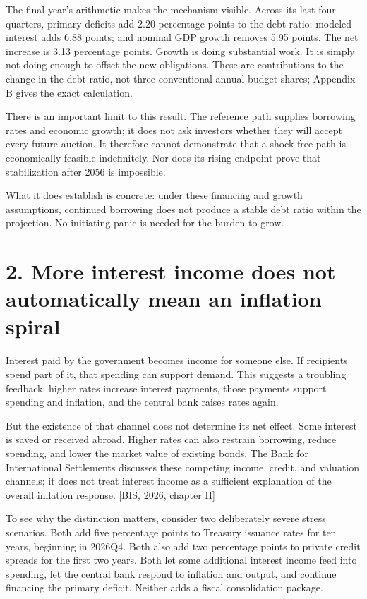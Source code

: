 \documentclass[11pt,letterpaper]{article}
\newcommand{\src}[2]{\href{#1}{#2}}
\begin{document}
The final year's arithmetic makes the mechanism visible. Across its last four
quarters, primary deficits add 2.20 percentage points to the debt ratio;
modeled interest adds 6.88 points; and nominal GDP growth removes 5.95 points.
The net increase is 3.13 percentage points. Growth is doing substantial work.
It is simply not doing enough to offset the new obligations.
These are contributions to the change in the debt ratio, not three conventional
annual budget shares; Appendix B gives the exact calculation.

There is an important limit to this result. The reference path supplies
borrowing rates and economic growth; it does not ask investors whether they
will accept every future auction. It therefore cannot demonstrate that a
shock-free path is economically feasible indefinitely. Nor does its rising
endpoint prove that stabilization after 2056 is impossible.

What it does establish is concrete: under these financing and growth
assumptions, continued borrowing does not produce a stable debt ratio within
the projection. No initiating panic is needed for the burden to grow.

\section*{2. More interest income does not automatically mean an inflation spiral}

Interest paid by the government becomes income for someone else. If recipients
spend part of it, that spending can support demand. This suggests a troubling
feedback: higher rates increase interest payments, those payments support
spending and inflation, and the central bank raises rates again.

But the existence of that channel does not determine its net effect. Some
interest is saved or received abroad. Higher rates can also restrain borrowing,
reduce spending, and lower the market value of existing bonds. The Bank for
International Settlements discusses these competing income, credit, and
valuation channels; it does not treat interest income as a sufficient
explanation of the overall inflation response.
\src{https://www.bis.org/publications/aer-2026/high-public-debt-shifting-financial-markets}
{[BIS, 2026, chapter II]}

To see why the distinction matters, consider two deliberately severe stress
scenarios. Both add five percentage points to Treasury issuance rates for ten
years, beginning in 2026Q4. Both also add two percentage points to private
credit spreads for the first two years. Both let some additional interest
income feed into spending, let the central bank respond to inflation and
output, and continue financing the primary deficit. Neither adds a fiscal
consolidation package.
\end{document}
